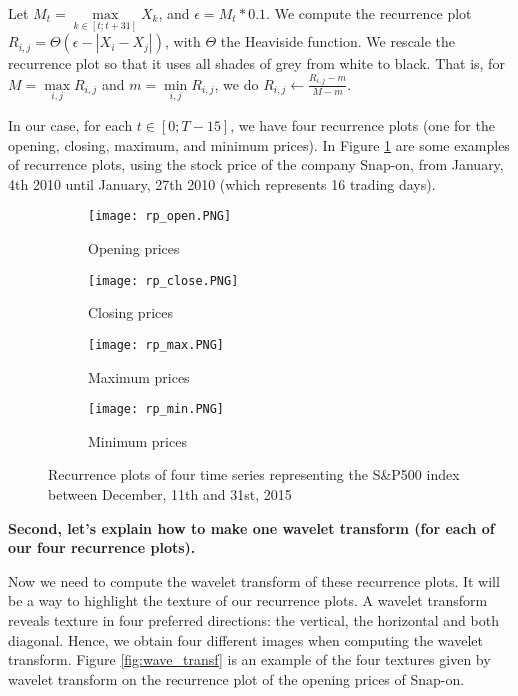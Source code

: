 \documentclass[11pt]{article}
\begin{document}
\begin{onehalfspace}
Let $M_t = \max\limits_{k \in [t;t+31]} X_k$, and $\epsilon = M_t * 0.1$. We compute the recurrence plot $R_{i,j} = \Theta (\epsilon - |X_i - X_j|)$, with $\Theta$ the Heaviside function. We rescale the recurrence plot so that it uses all shades of grey from white to black. That is, for $M = \max\limits_{i,j} R_{i,j}$ and $m = \min\limits_{i,j} R_{i,j}$, we do $R_{i,j} \leftarrow \frac{R_{i,j} - m }{M - m }$. 

In our case, for each $t \in [0; T-15]$, we have four recurrence plots (one for the opening, closing, maximum, and minimum prices). In Figure \ref{fig:rec_plot} are some examples of recurrence plots, using the stock price of the company Snap-on, from January, 4th 2010 until January, 27th 2010 (which represents 16 trading days). 

\begin{figure}[h!]
    \centering
    \captionsetup{justification=centering}
    \begin{subfigure}{0.24\textwidth}
        \texttt{[image: rp\_open.PNG]}
        \caption{Opening prices}
    \end{subfigure}
    \begin{subfigure}{0.24\textwidth}
        \texttt{[image: rp\_close.PNG]}
        \caption{Closing prices}
    \end{subfigure}
    \begin{subfigure}{0.24\textwidth}
        \texttt{[image: rp\_max.PNG]}
        \caption{Maximum prices}
    \end{subfigure}    
    \begin{subfigure}{0.24\textwidth}
        \texttt{[image: rp\_min.PNG]}
        \caption{Minimum prices}
    \end{subfigure}
    \caption{Recurrence plots of four time series representing the S\&P500 index between December, 11th and 31st, 2015}
    \label{fig:rec_plot}
\end{figure}

\noindent \textbf{Second, let's explain how to make one wavelet transform (for each of our four recurrence plots).}

Now we need to compute the wavelet transform of these recurrence plots. It will be a way to highlight the texture of our recurrence plots. A wavelet transform reveals texture in four preferred directions: the vertical, the horizontal and both diagonal. Hence, we obtain four different images when computing the wavelet transform. Figure \ref{fig:wave_transf} is an example of the four textures given by wavelet transform on the recurrence plot of the opening prices of Snap-on.


\end{onehalfspace}
\end{document}
